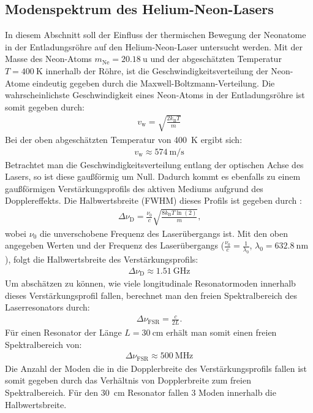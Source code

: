 \documentclass[11pt, a4paper]{article}
\numberwithin{equation}{section}
\begin{document}
\subsection{Modenspektrum des Helium-Neon-Lasers}
In diesem Abschnitt soll der Einfluss der thermischen Bewegung der Neonatome in der Entladungsröhre auf den Helium-Neon-Laser untersucht werden.
Mit der Masse des Neon-Atoms $m_\mathrm{Ne} = \SI{20.18}{\atomicmassunit}$ \cite{iupac_periodic_table} und der abgeschätzten Temperatur $T = \SI{400}{\kelvin}$ innerhalb der Röhre, ist die Geschwindigkeitsverteilung der Neon-Atome eindeutig gegeben durch die Maxwell-Boltzmann-Verteilung.
Die wahrscheinlichste Geschwindigkeit eines Neon-Atoms in der Entladungsröhre ist somit gegeben durch:
\begin{align}
	v_\mathrm{w} = \sqrt{\frac{2 k_\mathrm{B} T}{m}}
\end{align}
Bei der oben abgeschätzten Temperatur von \SI{400}{\kelvin} ergibt sich:
\begin{align}
	v_\mathrm{w} \approx \SI{574}{\metre\per\second}
\end{align}
Betrachtet man die Geschwindigkeitsverteilung entlang der optischen Achse des Lasers, so ist diese gaußförmig um Null.
Dadurch kommt es ebenfalls zu einem gaußförmigen Verstärkungsprofils des aktiven Mediums aufgrund des Dopplereffekts.
Die Halbwertsbreite (FWHM) dieses Profils ist gegeben durch \cite{meschede}:
\begin{align}
	\Delta \nu_\mathrm{D} = \frac{\nu_0}{c} \sqrt{\frac{8 k_\mathrm{B} T \ln(2)}{m}} \text{,}
\end{align}
wobei $\nu_0$ die unverschobene Frequenz des Laserübergangs ist.
Mit den oben angegeben Werten und der Frequenz des Laserübergangs ($\frac{\nu_0}{c} = \frac{1}{\lambda_0}$, $\lambda_0 = \SI{632.8}{\nano\metre}$), folgt die Halbwertsbreite des Verstärkungsprofils:
\begin{align}
	\Delta \nu_\mathrm{D} \approx \SI{1.51}{\giga\hertz}
\end{align}
Um abschätzen zu können, wie viele longitudinale Resonatormoden innerhalb dieses Verstärkungsprofil fallen, berechnet man den freien Spektralbereich des Laserresonators durch:
\begin{align}
	\Delta \nu_\mathrm{FSR} = \frac{c}{2 L} \text{.}
\end{align}
Für einen Resonator der Länge $L = \SI{30}{\centi\metre}$ erhält man somit einen freien Spektralbereich von:
\begin{align}
	\Delta \nu_\mathrm{FSR} \approx \SI{500}{\mega\hertz}
\end{align}
Die Anzahl der Moden die in die Dopplerbreite des Verstärkungsprofils fallen ist somit gegeben durch das Verhältnis von Dopplerbreite zum freien Spektralbereich.
Für den \SI{30}{\centi\metre} Resonator fallen \num{3} Moden innerhalb die Halbwertsbreite.
\end{document}
